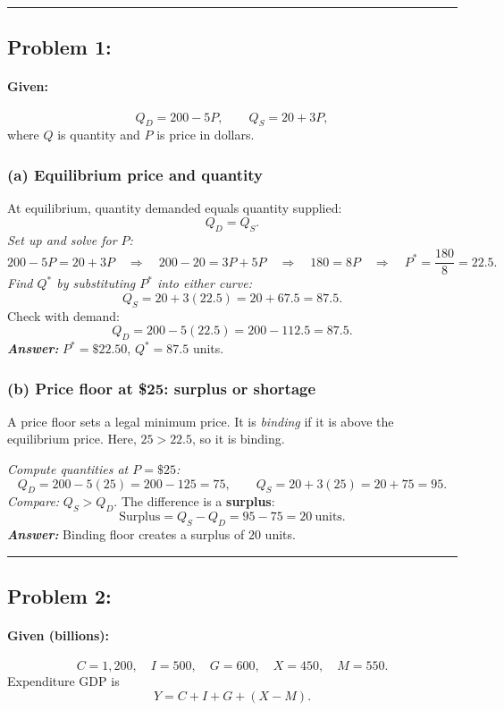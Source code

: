 \documentclass[11pt]{article}
\begin{document}
\bigskip
\hrule
\bigskip
\newpage



\subsection*{Problem 1:}

\paragraph{Given:}
\[
Q_D=200-5P,\qquad Q_S=20+3P,
\]
where \(Q\) is quantity and \(P\) is price in dollars.

\subsubsection*{(a) Equilibrium price and quantity}
At equilibrium, quantity demanded equals quantity supplied:
\[
Q_D=Q_S.
\]
\emph{Set up and solve for \(P\):}
\[
200-5P=20+3P
\quad\Rightarrow\quad
200-20=3P+5P
\quad\Rightarrow\quad
180=8P
\quad\Rightarrow\quad
P^\ast=\frac{180}{8}=22.5.
\]
\emph{Find \(Q^\ast\) by substituting \(P^\ast\) into either curve:}
\[
Q_S=20+3(22.5)=20+67.5=87.5.
\]
Check with demand:
\[
Q_D=200-5(22.5)=200-112.5=87.5.
\]
\emph{\textbf{Answer:}} \(P^\ast=\$22.50\), \(Q^\ast=87.5\) units.

\subsubsection*{(b) Price floor at \$25: surplus or shortage}
A price floor sets a legal minimum price. It is \emph{binding} if it is above the equilibrium price. Here, \(25>22.5\), so it is binding.

\emph{Compute quantities at \(P=\$25\):}
\[
Q_D=200-5(25)=200-125=75,\qquad
Q_S=20+3(25)=20+75=95.
\]
\emph{Compare:} \(Q_S>Q_D\). The difference is a \textbf{surplus}:
\[
\text{Surplus}=Q_S-Q_D=95-75=20\ \text{units}.
\]
\emph{\textbf{Answer:}} Binding floor creates a surplus of \(20\) units.

\bigskip
\hrule
\bigskip
\newpage
\subsection*{Problem 2:}

\paragraph{Given (billions):}
\[
C=1{,}200,\quad I=500,\quad G=600,\quad X=450,\quad M=550.
\]
Expenditure GDP is
\[
Y=C+I+G+(X-M).
\]
\end{document}
